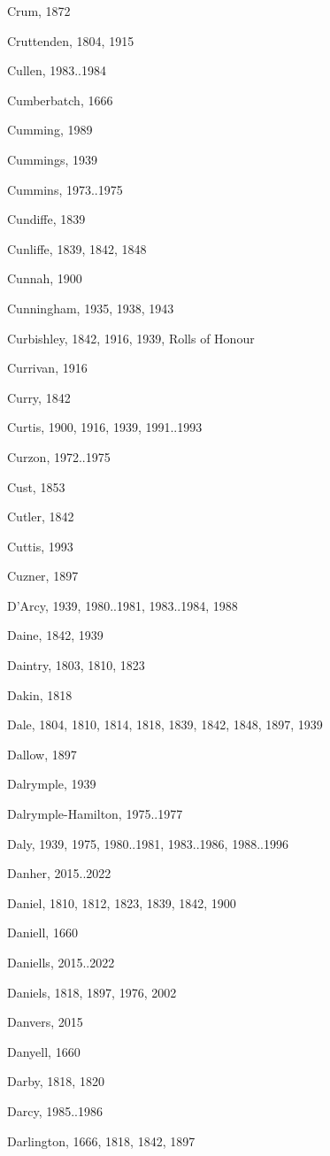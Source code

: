 \begin{theindex}
\item Crum, 1872
\item Cruttenden, 1804, 1915
\item Cullen, 1983..1984
\item Cumberbatch, 1666
\item Cumming, 1989
\item Cummings, 1939
\item Cummins, 1973..1975
\item Cundiffe, 1839
\item Cunliffe, 1839, 1842, 1848
\item Cunnah, 1900
\item Cunningham, 1935, 1938, 1943
\item Curbishley, 1842, 1916, 1939, Rolls of Honour
\item Currivan, 1916
\item Curry, 1842
\item Curtis, 1900, 1916, 1939, 1991..1993
\item Curzon, 1972..1975
\item Cust, 1853
\item Cutler, 1842
\item Cuttis, 1993
\item Cuzner, 1897
\item D'Arcy, 1939, 1980..1981, 1983..1984, 1988
\item Daine, 1842, 1939
\item Daintry, 1803, 1810, 1823
\item Dakin, 1818
\item Dale, 1804, 1810, 1814, 1818, 1839, 1842, 1848, 1897, 1939
\item Dallow, 1897
\item Dalrymple, 1939
\item Dalrymple-Hamilton, 1975..1977
\item Daly, 1939, 1975, 1980..1981, 1983..1986, 1988..1996
\item Danher, 2015..2022
\item Daniel, 1810, 1812, 1823, 1839, 1842, 1900
\item Daniell, 1660
\item Daniells, 2015..2022
\item Daniels, 1818, 1897, 1976, 2002
\item Danvers, 2015
\item Danyell, 1660
\item Darby, 1818, 1820
\item Darcy, 1985..1986
\item Darlington, 1666, 1818, 1842, 1897

\end{theindex}
